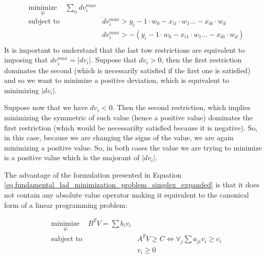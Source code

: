 \begin{equation}
\begin{aligned}
& \underset{\hat{w}}{\text{minimize}} &  \sum_n dv^{max}_i  & \\
& \text{subject to}                              & & dv^{max}_i > y_i - 1 \cdot w_0 - x_{i1} \cdot w_1 ... - x_{di} \cdot w_d \\
&                                                        & & dv^{max}_i > - (y_i - 1 \cdot w_0 - x_{i1} \cdot w_1 ... - x_{di} \cdot w_d) \\
\label{eq.fundamental_lad_minimization_problem_simplex_expanded}
\end{aligned}
\end{equation}
It is important to understand that the last tow restrictions are equivalent to imposing that $dv^{max}_i = | dv_i |$. Suppose that $dv_i > 0$, then the first restriction dominates the second (which is necessarily satisfied if the first one is satisfied) and so we want to minimize a positive deviation, which is equivalent to minimizing $|dv_i|$. 

Suppose now that we have $dv_i < 0$. Then the second restriction, which implies minimizing the symmetric of such value (hence a positive value) dominates the first restriction (which would be necessarilty satisfied because it is negative). So, in this case, because we are changing the signs of the value, we are again minimizing a positive value. So, in both cases the value we are trying to minimize is a positive value which is the majorant of $|dv_i|$.

The advantage of the formulation presented in Equation \ref{eq.fundamental_lad_minimization_problem_simplex_expanded} is that it does not contain any absolute value operator making it equivalent to the canonical form of a linear programming problem:

\begin{equation}
\begin{aligned}
& \underset{\hat{w}}{\text{minimize}} &  B^TV = \sum b_i v_i & \\
& \text{subject to}                              & &  A^T V \ge C \Leftrightarrow \forall_j \sum a_{ji} v_i \ge c_i\\
&                                                        & & v_i \ge 0 \\
\label{eq.canonical_linear_programming}
\end{aligned}
\end{equation}

